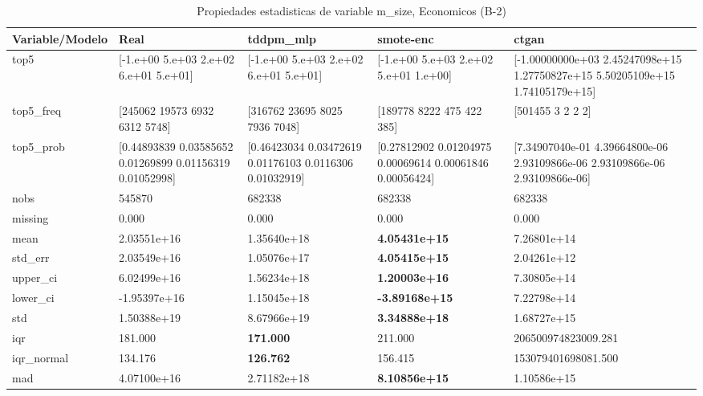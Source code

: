\begin{table}[H]
\centering
\fontsize{8}{14}\selectfont
\caption{Propiedades  estadisticas de variable m\_size, Economicos (B-2)}
\label{table-stats-economicos-b-2-m_size}
\begin{tabular}{|l|m{10em}|m{10em}|m{10em}|m{10em}|}
\hline
 \rowcolor[gray]{0.8}
Variable/Modelo & Real & tddpm\_mlp & smote-enc & ctgan \\
\hline top5 & [-1.e+00  5.e+03  2.e+02  6.e+01  5.e+01] & [-1.e+00  5.e+03  2.e+02  6.e+01  5.e+01] & [-1.e+00  5.e+03  2.e+02  5.e+01  1.e+00] & [-1.00000000e+03  2.45247098e+15  1.27750827e+15  5.50205109e+15
  1.74105179e+15] \\
\hline top5\_freq & [245062  19573   6932   6312   5748] & [316762  23695   8025   7936   7048] & [189778   8222    475    422    385] & [501455      3      2      2      2] \\
\hline top5\_prob & [0.44893839 0.03585652 0.01269899 0.01156319 0.01052998] & [0.46423034 0.03472619 0.01176103 0.0116306  0.01032919] & [0.27812902 0.01204975 0.00069614 0.00061846 0.00056424] & [7.34907040e-01 4.39664800e-06 2.93109866e-06 2.93109866e-06
 2.93109866e-06] \\
\hline nobs & 545870 & 682338 & 682338 & 682338 \\
\hline missing & 0.000 & 0.000 & 0.000 & 0.000 \\
\hline mean & 2.03551e+16 & \cellcolor[rgb]{0.9, 0.54, 0.52} 1.35640e+18 & \bfseries 4.05431e+15 & 7.26801e+14 \\
\hline std\_err & 2.03549e+16 & \cellcolor[rgb]{0.9, 0.54, 0.52} 1.05076e+17 & \bfseries 4.05415e+15 & 2.04261e+12 \\
\hline upper\_ci & 6.02499e+16 & \cellcolor[rgb]{0.9, 0.54, 0.52} 1.56234e+18 & \bfseries 1.20003e+16 & 7.30805e+14 \\
\hline lower\_ci & -1.95397e+16 & \cellcolor[rgb]{0.9, 0.54, 0.52} 1.15045e+18 & \bfseries -3.89168e+15 & 7.22798e+14 \\
\hline std & 1.50388e+19 & \cellcolor[rgb]{0.9, 0.54, 0.52} 8.67966e+19 & \bfseries 3.34888e+18 & 1.68727e+15 \\
\hline iqr & 181.000 & \bfseries 171.000 & 211.000 & \cellcolor[rgb]{0.9, 0.54, 0.52} 206500974823009.281 \\
\hline iqr\_normal & 134.176 & \bfseries 126.762 & 156.415 & \cellcolor[rgb]{0.9, 0.54, 0.52} 153079401698081.500 \\
\hline mad & 4.07100e+16 & \cellcolor[rgb]{0.9, 0.54, 0.52} 2.71182e+18 & \bfseries 8.10856e+15 & 1.10586e+15 \\

\end{tabular}
\end{table}
